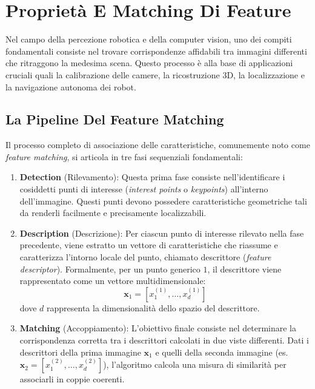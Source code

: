 ﻿\documentclass[11pt, a4paper]{article}
\author{Francesco Lo Verde}
\begin{document}
\section{Proprietà E Matching Di Feature}

Nel campo della percezione robotica e della computer vision, uno dei compiti fondamentali consiste nel trovare corrispondenze affidabili tra immagini differenti che ritraggono la medesima scena. Questo processo è alla base di applicazioni cruciali quali la calibrazione delle camere, la ricostruzione 3D, la localizzazione e la navigazione autonoma dei robot.


\subsection{La Pipeline Del Feature Matching}

Il processo completo di associazione delle caratteristiche, comunemente noto come \emph{feature matching}, si articola in tre fasi sequenziali fondamentali:


\begin{enumerate}
    \item \textbf{Detection} (Rilevamento): Questa prima fase consiste nell'identificare i cosiddetti punti di interesse (\emph{interest points} o \emph{keypoints}) all'interno dell'immagine. Questi punti devono possedere caratteristiche geometriche tali da renderli facilmente e precisamente localizzabili.
    \item \textbf{Description} (Descrizione): Per ciascun punto di interesse rilevato nella fase precedente, viene estratto un vettore di caratteristiche che riassume e caratterizza l'intorno locale del punto, chiamato descrittore (\emph{feature descriptor}). Formalmente, per un punto generico $1$, il descrittore viene rappresentato come un vettore multidimensionale:
    \[ \bm{x}_1 = \left[ x_1^{(1)}, \dots, x_d^{(1)} \right] \]
    dove $d$ rappresenta la dimensionalità dello spazio del descrittore.
    \item \textbf{Matching} (Accoppiamento): L'obiettivo finale consiste nel determinare la corrispondenza corretta tra i descrittori calcolati in due viste differenti. Dati i descrittori della prima immagine $\bm{x}_1$ e quelli della seconda immagine (es. $\bm{x}_2 = \left[ x_1^{(2)}, \dots, x_d^{(2)} \right]$), l'algoritmo calcola una misura di similarità per associarli in coppie coerenti.
\end{enumerate}
\end{document}
